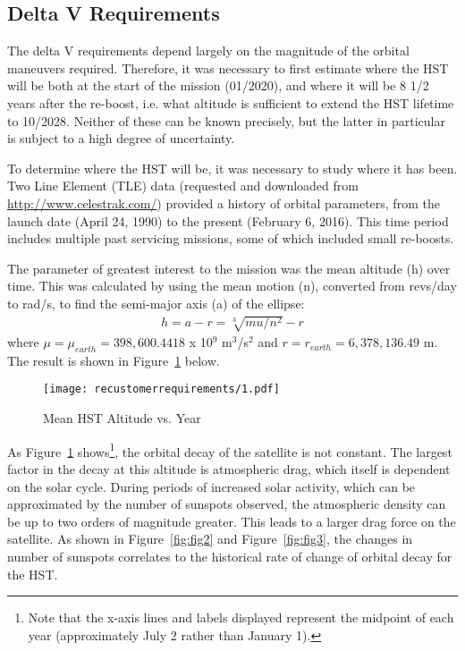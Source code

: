 \documentclass[onecolumn,10pt]{jhwhw}
\begin{document}
\subsection{Delta V Requirements}
The delta V requirements depend largely on the magnitude of the orbital maneuvers required. Therefore, it was necessary to first estimate where the HST will be both at the start of the mission (01/2020), and where it will be 8 1/2 years after the re-boost, i.e. what altitude is sufficient to extend the HST lifetime to 10/2028. Neither of these can be known precisely, but the latter in particular is subject to a high degree of uncertainty.

To determine where the HST will be, it was necessary to study where it has been. Two Line Element (TLE) data (requested and downloaded from \url{http://www.celestrak.com/}) provided a history of orbital parameters, from the launch date (April 24, 1990) to the present (February 6, 2016). This time period includes multiple past servicing missions, some of which included small re-boosts.

The parameter of greatest interest to the mission was the mean altitude (h) over time. This was calculated by using the mean motion (n), converted from revs/day to rad/s, to find the semi-major axis (a) of the ellipse:
\begin{align*}
h = a - r = \sqrt[3]{mu/n^2} - r
\end{align*}
where $\mu = \mu_{earth} = 398,600.4418$ x 10$^9$ m$^3$/s$^2$ and $r = r_{earth} = 6,378,136.49$ m. The result is shown in Figure~\ref{fig:fig1} below.

\begin{figure}[tb!]
\begin{center}
\texttt{[image: recustomerrequirements/1.pdf]}
\caption{Mean HST Altitude vs. Year}
\label{fig:fig1}
\end{center}
\end{figure}

As Figure~\ref{fig:fig1} shows\footnote{Note that the x-axis lines and labels displayed represent the midpoint of each year (approximately July 2 rather than January 1).}, the orbital decay of the satellite is not constant. The largest factor in the decay at this altitude is atmospheric drag, which itself is dependent on the solar cycle. During periods of increased solar activity, which can be approximated by the number of sunspots observed, the atmospheric density can be up to two orders of magnitude greater. This leads to a larger drag force on the satellite. As shown in Figure~\ref{fig:fig2} and Figure~\ref{fig:fig3}, the changes in number of sunspots correlates to the historical rate of change of orbital decay for the HST.
\end{document}
